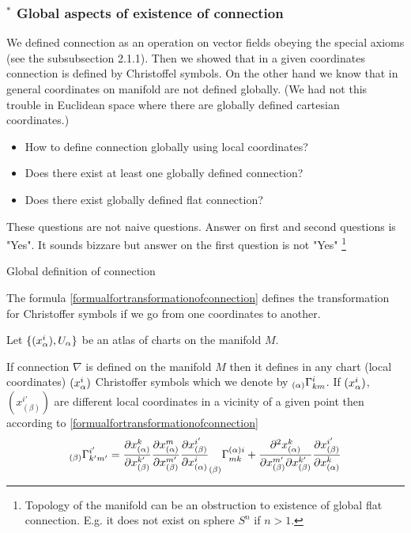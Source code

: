 \documentclass[12pt]{article}
\theoremstyle{theorem}
\numberwithin{equation}{section}
\begin{document}
\subsubsection {$^*$ Global aspects of existence of connection}

{\small We defined connection as an operation on vector fields obeying the special axioms (see the subsubsection 2.1.1).
Then we showed that in a given coordinates
connection is defined by Christoffel symbols. On the other hand we know that in general
coordinates on manifold are not defined  globally. (We had not this trouble in Euclidean space where there are globally
defined cartesian coordinates.)

\begin{itemize}

\item How to define connection globally using local coordinates?

\item Does there exist at least one globally defined connection?

\item   Does there exist globally defined flat connection?

  \end{itemize}

  These questions are not  naive questions.   Answer on first and second questions is "Yes".
   It sounds bizzare but answer on the first question is not "Yes" \footnote{
    Topology of the manifold can be an obstruction to existence
of global flat connection.  E.g. it does not exist on sphere $S^n$ if $n>1$.}


     \centerline{Global definition of connection}

  The formula  \eqref{formualfortransformationofconnection} defines the transformation for
  Christoffer symbols if we go from one coordinates to another.


  Let $\{(x^i_\alpha), U_\alpha\}$ be an atlas of charts on the manifold $M$.

  If connection $\nabla$ is defined on the manifold $M$ then
  it defines in any chart (local coordinates) $(x^i_\alpha)$ Christoffer symbols
  which we denote by $_{(\alpha)}\Gamma^{i}_{km}$.
  If $(x^i_\alpha)$, $(x^{i'}_{(\beta)})$ are different local coordinates in a vicinity of a given point then
  according to \eqref{formualfortransformationofconnection}
     \begin{equation}\label{symbolsinlocalchart}
                        _{(\beta)}\Gamma^{i'}_{k'm'}=
          {\partial x^k_{(\alpha)}\over \partial x^{k'}_{(\beta)}}
          {\partial x^m_{(\alpha)}\over \partial x^{m'}_{(\beta)}}
          {\partial x^{i'}_{(\beta)}\over \partial x^i_{(\alpha)}}
          _{(\beta)}\Gamma_{mk}^{(\alpha)i}+
      {\partial^2  x^{k}_{(\alpha)}\over \partial x^{m'}_{(\beta)}\partial x^{k'}_{(\beta)}}
                  {\partial x^{i'}_{(\beta)}\over \partial x^{k}_{(\alpha)}}
                 \end{equation}


}
\end{document}

